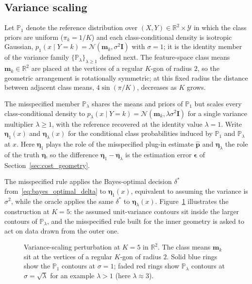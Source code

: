 \subsection{Variance scaling}\label{sec:misspec_sensitivity_variance}

Let $\mathbb{P}_1$ denote the reference distribution over $(X, Y) \in \mathbb{R}^2 \times \mathcal{Y}$ in which the class priors are uniform ($\pi_k = 1/K$) and each class-conditional density is isotropic Gaussian, $p_1(x \mid Y{=}k) = \mathcal{N}(\mathbf{m}_k, \sigma^2 \mathbf{I})$ with $\sigma = 1$; it is the identity member of the variance family $\{\mathbb{P}_\lambda\}_{\lambda \geq 1}$ defined next. The feature-space class means $\mathbf{m}_k \in \mathbb{R}^2$ are placed at the vertices of a regular $K$-gon of radius $2$, so the geometric arrangement is rotationally symmetric; at this fixed radius the distance between adjacent class means, $4\sin(\pi/K)$, decreases as $K$ grows.

The misspecified member $\mathbb{P}_\lambda$ shares the means and priors of $\mathbb{P}_1$ but scales every class-conditional density to $p_\lambda(x \mid Y{=}k) = \mathcal{N}(\mathbf{m}_k, \lambda\sigma^2 \mathbf{I})$ for a single variance multiplier $\lambda \geq 1$, with the reference recovered at the identity value $\lambda = 1$. Write $\boldsymbol{\eta}_1(x)$ and $\boldsymbol{\eta}_\lambda(x)$ for the conditional class probabilities induced by $\mathbb{P}_1$ and $\mathbb{P}_\lambda$ at $x$. Here $\boldsymbol{\eta}_1$ plays the role of the misspecified plug-in estimate $\hat{\mathbf{p}}$ and $\boldsymbol{\eta}_\lambda$ the role of the truth $\boldsymbol{\eta}$, so the difference $\boldsymbol{\eta}_1 - \boldsymbol{\eta}_\lambda$ is the estimation error $\boldsymbol{\epsilon}$ of Section~\ref{sec:cost_geometry}.

The misspecified rule applies the Bayes-optimal decision $\delta^*$ from~\eqref{eq:bayes_optimal_delta} to $\boldsymbol{\eta}_1(x)$, equivalent to assuming the variance is $\sigma^2$, while the oracle applies the same $\delta^*$ to $\boldsymbol{\eta}_\lambda(x)$. Figure~\ref{fig:misspec-sensitivity-setup-geometry} illustrates the construction at $K = 5$: the assumed unit-variance contours sit inside the larger contours of $\mathbb{P}_\lambda$, and the misspecified rule built for the inner geometry is asked to act on data drawn from the outer one.

\begin{figure}[H]
    \centering
    
    \caption{Variance-scaling perturbation at $K = 5$ in $\mathbb{R}^2$. The class means $\mathbf{m}_k$ sit at the vertices of a regular $K$-gon of radius $2$. Solid blue rings show the $\mathbb{P}_1$ contours at $\sigma = 1$; faded red rings show $\mathbb{P}_\lambda$ contours at $\sigma = \sqrt{\lambda}$ for an example $\lambda > 1$ (here $\lambda \approx 3$).}%
    \label{fig:misspec-sensitivity-setup-geometry}
\end{figure}

